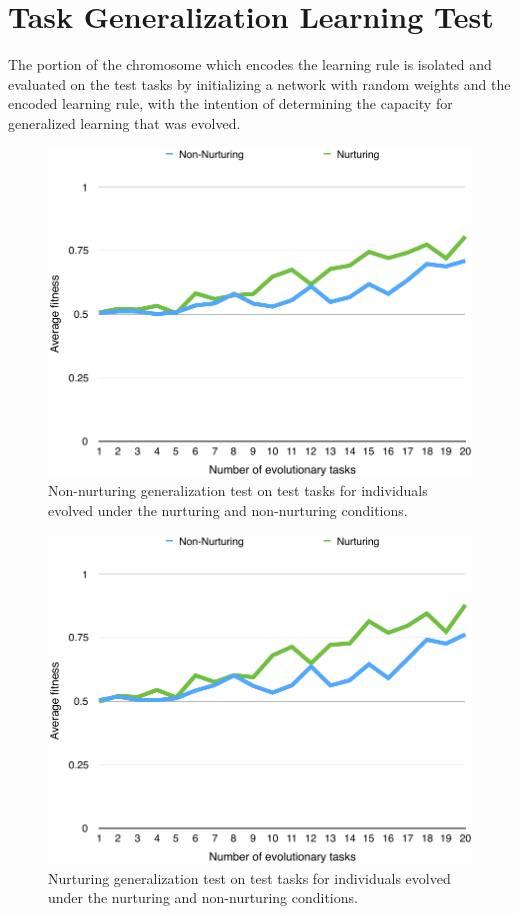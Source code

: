\documentclass[master]{outhesis}
\begin{document}
\section{Task Generalization Learning Test}

The portion of the chromosome which encodes the learning rule is isolated and evaluated on the test tasks by initializing a network with random weights and the encoded learning rule, with the intention of determining the capacity for generalized learning that was evolved.

\begin{figure}[H]
	\centering
	\includegraphics{NonNurturingGeneralizationTestPlot.pdf}
	\caption{Non-nurturing generalization test on test tasks for individuals evolved under the nurturing and non-nurturing conditions.}
\end{figure}

\begin{figure}[H]
	\centering
	\includegraphics{NurturingGeneralizationTestPlot.pdf}
	\caption{Nurturing generalization test on test tasks for individuals evolved under the nurturing and non-nurturing conditions.}
\end{figure}
\end{document}
